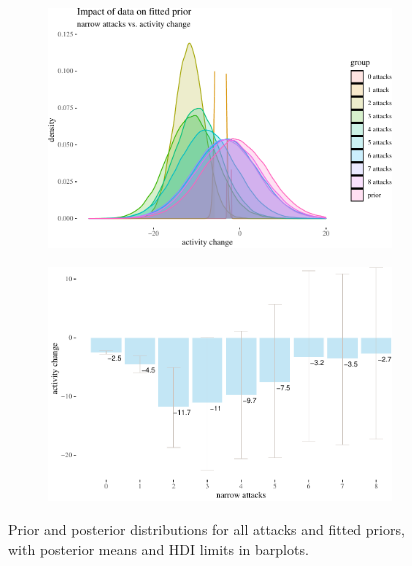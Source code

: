 \documentclass[10pt,]{scrartcl}
\begin{document}
\begin{figure}[!ht]
\begin{subfigure}[!ht]{0.9\textwidth}

\begin{center}\includegraphics[width=1\linewidth]{redditAnalysisWalkthrough_files/figure-latex/unnamed-chunk-60-1} \end{center}
\end{subfigure} 


\begin{subfigure}[!ht]{0.9\textwidth}

\begin{center}\includegraphics[width=1\linewidth]{redditAnalysisWalkthrough_files/figure-latex/unnamed-chunk-61-1} \end{center}
\end{subfigure}
\caption{Prior and posterior distributions for all attacks and fitted priors, with posterior means and HDI limits in barplots.}
\label{fig:bayesian2}
\end{figure}
\end{document}
